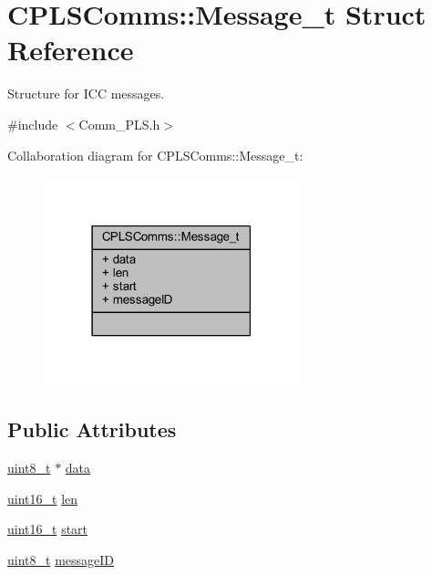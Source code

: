 \hypertarget{struct_c_p_l_s_comms_1_1_message__t}{}\section{C\+P\+L\+S\+Comms\+::Message\+\_\+t Struct Reference}
\label{struct_c_p_l_s_comms_1_1_message__t}


Structure for I\+CC messages.  




{\ttfamily \#include $<$Comm\+\_\+\+P\+L\+S.\+h$>$}



Collaboration diagram for C\+P\+L\+S\+Comms\+::Message\+\_\+t\+:\nopagebreak
\begin{figure}[H]
\begin{center}
\leavevmode
\includegraphics[width=210pt]{struct_c_p_l_s_comms_1_1_message__t__coll__graph}
\end{center}
\end{figure}
\subsection*{Public Attributes}
\begin{DoxyCompactItemize}
\item 
\mbox{\hyperlink{_a_d_a_s___types_8h_aba7bc1797add20fe3efdf37ced1182c5}{uint8\+\_\+t}} $\ast$ \mbox{\hyperlink{struct_c_p_l_s_comms_1_1_message__t_a75d42db0cfdf64c0fe1ed1e8b0c472ed}{data}}
\item 
\mbox{\hyperlink{_a_d_a_s___types_8h_a1f1825b69244eb3ad2c7165ddc99c956}{uint16\+\_\+t}} \mbox{\hyperlink{struct_c_p_l_s_comms_1_1_message__t_a3af5b7fed96b157285ec6c8168b64276}{len}}
\item 
\mbox{\hyperlink{_a_d_a_s___types_8h_a1f1825b69244eb3ad2c7165ddc99c956}{uint16\+\_\+t}} \mbox{\hyperlink{struct_c_p_l_s_comms_1_1_message__t_a760e6f39adfed2b0440477560654f02f}{start}}
\item 
\mbox{\hyperlink{_a_d_a_s___types_8h_aba7bc1797add20fe3efdf37ced1182c5}{uint8\+\_\+t}} \mbox{\hyperlink{struct_c_p_l_s_comms_1_1_message__t_a451cdd914ba11c33528a4761ad38faee}{message\+ID}}
\end{DoxyCompactItemize}


